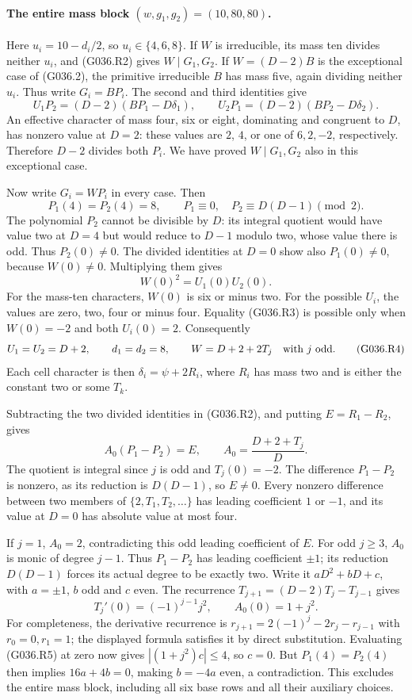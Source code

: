 \paragraph{The entire mass block $(w,g_1,g_2)=(10,80,80)$.}
Here $u_i=10-d_i/2$, so $u_i\in\{4,6,8\}$.
If $W$ is irreducible, its mass ten divides neither
$u_i$, and (G036.R2) gives $W\mid G_1,G_2$.
If $W=(D-2)B$ is the exceptional case of (G036.2),
the primitive irreducible $B$ has mass five, again
dividing neither $u_i$. Thus write $G_i=BP_i$.
The second and third identities give
\[
 U_1P_2=(D-2)(BP_1-D\delta_1),\qquad
 U_2P_1=(D-2)(BP_2-D\delta_2).
\]
An effective character of mass four, six or eight,
dominating and congruent to $D$, has nonzero value
at $D=2$: these values are $2$, $4$, or one of
$6,2,-2$, respectively. Therefore $D-2$ divides
both $P_i$. We have proved $W\mid G_1,G_2$ also
in this exceptional case.

Now write $G_i=WP_i$ in every case. Then
\[
 P_1(4)=P_2(4)=8,\qquad P_1\equiv0,\quad
 P_2\equiv D(D-1)\pmod2.
\]
The polynomial $P_2$ cannot be divisible by $D$:
its integral quotient would have value two at $D=4$
but would reduce to $D-1$ modulo two, whose value
there is odd. Thus $P_2(0)\ne0$.
The divided identities at $D=0$ show also
$P_1(0)\ne0$, because $W(0)\ne0$.
Multiplying them gives
\[
                        W(0)^2=U_1(0)U_2(0).        \tag{G036.R3}
\]
For the mass-ten characters, $W(0)$ is six or
minus two. For the possible $U_i$, the values are
zero, two, four or minus four. Equality (G036.R3)
is possible only when $W(0)=-2$ and both $U_i(0)=2$.
Consequently
\[
 U_1=U_2=D+2,\qquad d_1=d_2=8,\qquad
 W=D+2+2T_j\quad\hbox{with }j\hbox{ odd}.             \tag{G036.R4}
\]
Each cell character is then $\delta_i=\psi+2R_i$,
where $R_i$ has mass two and is either the constant
two or some $T_k$.

Subtracting the two divided identities in (G036.R2),
and putting $E=R_1-R_2$, gives
\[
 A_0(P_1-P_2)=E,\qquad
 A_0=\frac{D+2+T_j}{D}.                             \tag{G036.R5}
\]
The quotient is integral since $j$ is odd and
$T_j(0)=-2$. The difference $P_1-P_2$ is nonzero,
as its reduction is $D(D-1)$, so $E\ne0$.
Every nonzero difference between two members of
$\{2,T_1,T_2,\ldots\}$ has leading coefficient
$1$ or $-1$, and its value at $D=0$ has absolute
value at most four.

If $j=1$, $A_0=2$, contradicting this odd leading
coefficient of $E$.
For odd $j\ge3$, $A_0$ is monic of degree $j-1$.
Thus $P_1-P_2$ has leading coefficient $\pm1$;
its reduction $D(D-1)$ forces its actual degree
to be exactly two. Write it $aD^2+bD+c$, with
$a=\pm1$, $b$ odd and $c$ even.
The recurrence $T_{j+1}=(D-2)T_j-T_{j-1}$ gives
\[
 T_j'(0)=(-1)^{j-1}j^2,\qquad A_0(0)=1+j^2.
\]
For completeness, the derivative recurrence is
$r_{j+1}=2(-1)^j-2r_j-r_{j-1}$ with
$r_0=0,r_1=1$; the displayed formula satisfies it
by direct substitution.
Evaluating (G036.R5) at zero now gives
$|(1+j^2)c|\le4$, so $c=0$.
But $P_1(4)=P_2(4)$ then implies
$16a+4b=0$, making $b=-4a$ even, a contradiction.
This excludes the entire mass block, including
all six base rows and all their auxiliary choices.

